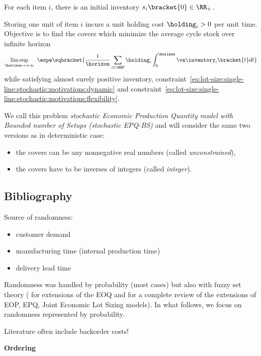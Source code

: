 For each item $i$, there is an initial inventory $s_i\bracket{0}\in\RR_+$.


Storing one unit of item $i$ incurs a unit holding cost $\holding_i>0$ per unit time.
Objective is to find the covers which minimize the average cycle stock over infinite horizon
\begin{equation}
  \limsup_{\horizon\rightarrow+\infty}
  \ 
  \espe\sqbracket{
  \frac{1}{\horizon} \sum_{i\in\REF} \holding_i \int_0^{\horizon}\va\inventory_i\bracket{t}dt
  }
\end{equation}
while satisfying almost surely positive inventory, constraint~\eqref{eq:lot-size:single-line:stochastic:motivations:dynamic} and constraint~\eqref{eq:lot-size:single-line:stochastic:motivations:flexibility}.


We call this problem \emph{stochastic Economic Production Quantity model with Bounded number of Setups (stochastic EPQ-BS)} and will consider the same two versions as in deterministic case:
\begin{itemize}
  \item the covers can be any nonnegative real numbers (called \emph{unconstrained}),
  \item the covers have to be inverses of integers (called \emph{integer}).
\end{itemize}



\subsection{Bibliography}

Source of randomness:
\begin{itemize}
  \item customer demand
  \item manufacturing time (internal production time)
  \item delivery lead time
\end{itemize}

Randomness was handled by probability (most cases) but also with fuzzy set theory (\eg \cite{Park1987,Lee1999,Wang2007} for extensions of the EOQ and \cite{Ziukov2015} for a complete review of the extensions of EOP, EPQ, Joint Economic Lot Sizing models).
In what follows, we focus on randomness represented by probability.

Literature often include backorder costs!

\medskip

\textbf{Ordering}

